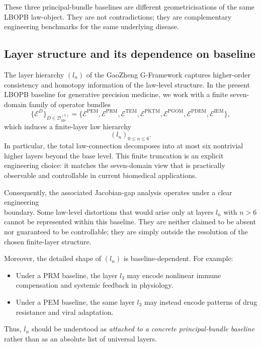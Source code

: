 \documentclass[11pt]{book}
\theoremstyle{plain}
\theoremstyle{definition}
\theoremstyle{remark}
\begin{document}
These three principal-bundle baselines are different geometricisations
of the same LBOPB law-object.
They are not contradictions; they are complementary engineering
benchmarks for the same underlying disease.



\subsection{Layer structure and its dependence on baseline}

The layer hierarchy \((l_n)\) of the GaoZheng G-Framework captures
higher-order consistency and homotopy information of the law-level
structure.
In the present LBOPB baseline for generative precision medicine, we work
with a finite seven-domain family of operator bundles
\[
  \{\mathcal{E}^{D}\}_{D\in\mathcal{D}_{\mathrm{life}}^{(7)}}
  =
  \bigl\{
    \mathcal{E}^{\mathrm{PEM}},
    \mathcal{E}^{\mathrm{PRM}},
    \mathcal{E}^{\mathrm{TEM}},
    \mathcal{E}^{\mathrm{PKTM}},
    \mathcal{E}^{\mathrm{PGOM}},
    \mathcal{E}^{\mathrm{PDEM}},
    \mathcal{E}^{\mathrm{IEM}}
  \bigr\},
\]
which induces a finite-layer law hierarchy
\[
  (l_n)_{0 \le n \le 6}.
\]
In particular, the total law-connection decomposes into at most six
nontrivial higher layers beyond the base level.
This finite truncation is an explicit engineering choice: it matches the
seven-domain view that is practically observable and controllable in
current biomedical applications.

Consequently, the associated Jacobian-gap analysis operates under a
clear engineering \\boundary.
Some law-level distortions that would arise only at layers
\(l_n\) with \(n>6\) cannot be represented within this baseline.
They are neither claimed to be absent nor guaranteed to be controllable;
they are simply outside the resolution of the chosen finite-layer
structure.

Moreover, the detailed shape of \((l_n)\) is baseline-dependent.
For example:
\begin{itemize}
  \item Under a PRM baseline, the layer \(l_3\) may encode nonlinear
        immune compensation and systemic feedback in physiology.
  \item Under a PEM baseline, the same layer \(l_3\) may instead encode
        patterns of drug resistance and viral adaptation.
\end{itemize}
Thus, \(l_n\) should be understood as \emph{attached to a concrete
principal-bundle baseline} rather than as an absolute list of universal
layers.
\end{document}
